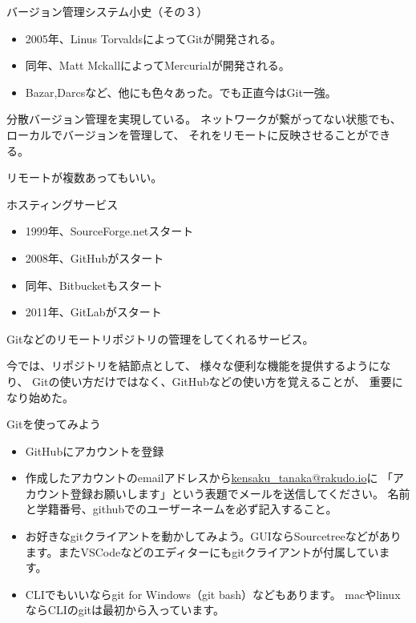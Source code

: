\documentclass[12pt, unicode]{beamer}
\begin{document}
\begin{frame}{バージョン管理システム小史（その３）}
\begin{itemize}
\item 2005年、Linus TorvaldsによってGitが開発される。
\item 同年、Matt MckallによってMercurialが開発される。
\item Bazar,Darcsなど、他にも色々あった。でも正直今はGit一強。
\end{itemize}

分散バージョン管理を実現している。
ネットワークが繋がってない状態でも、
ローカルでバージョンを管理して、
それをリモートに反映させることができる。

リモートが複数あってもいい。

\end{frame}
\begin{frame}{ホスティングサービス}
\begin{itemize}
\item 1999年、SourceForge.netスタート
\item 2008年、GitHubがスタート
\item 同年、Bitbucketもスタート
\item 2011年、GitLabがスタート
\end{itemize}

Gitなどのリモートリポジトリの管理をしてくれるサービス。

今では、リポジトリを結節点として、
様々な便利な機能を提供するようになり、
Gitの使い方だけではなく、GitHubなどの使い方を覚えることが、
重要になり始めた。


\end{frame}
\begin{frame}{Gitを使ってみよう}

\begin{itemize}
\item GitHubにアカウントを登録
\item 作成したアカウントのemailアドレスから\url{kensaku\_tanaka@rakudo.io}に
「アカウント登録お願いします」という表題でメールを送信してください。
名前と学籍番号、githubでのユーザーネームを必ず記入すること。
\item お好きなgitクライアントを動かしてみよう。GUIならSourcetreeなどがあります。またVSCodeなどのエディターにもgitクライアントが付属しています。
\item CLIでもいいならgit for Windows（git bash）などもあります。
macやlinuxならCLIのgitは最初から入っています。
\end{itemize}

\end{frame}
\end{document}
